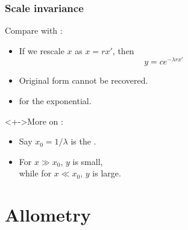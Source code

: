 \begin{frame}
  \frametitle{Scale invariance}

  \begin{block}{Compare with :}
    \begin{itemize}
    \item<+->
      If we rescale $x$ as $x = rx'$, then
      $$ y = c e^{-\lambda rx'} $$
    \item<+-> 
      Original form cannot be recovered.
    \item<+-> 
       for the exponential.
    \end{itemize}
  \end{block}

  \begin{block}<+->{More on :}
    \begin{itemize}
    \item<+-> 
      Say $x_0 = 1/\lambda$ is the .
    \item<+-> 
      For $x \gg x_0$, $y$ is small,\\
      while for $x \ll x_0$, $y$ is large.
    \end{itemize}
  \end{block}

\end{frame}



\section{Allometry}      

